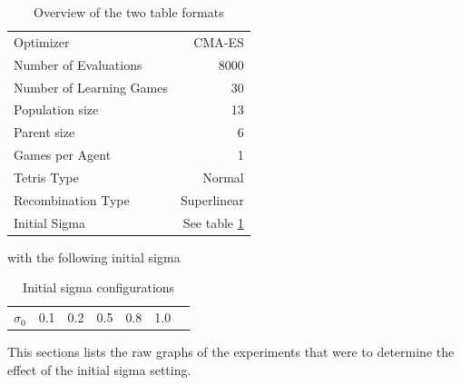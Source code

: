 \begin{table}[h]
\centering
\caption{Overview of the two table formats}
\begin{tabular}{l r}
Optimizer & CMA-ES\\
Number of Evaluations & 8000\\
Number of Learning Games &30\\
Population size& 13\\
Parent size & 6\\
Games per Agent & 1\\
Tetris Type & Normal\\
\hline
Recombination Type & Superlinear\\
Initial Sigma & See table \ref{InitialSigmaTest}
\end{tabular}
\end{table}

with the following initial sigma

\begin{table}[H]
\centering
\begin{tabular}{c | c c c c c c}
$\sigma_0$ & 0.1 & 0.2 & 0.5 & 0.8 & 1.0
\end{tabular}
\caption{Initial sigma configurations \label{InitialSigmaTest}}
\end{table}
This sections lists the raw graphs of the experiments that were
to determine the effect of the initial sigma setting. 

